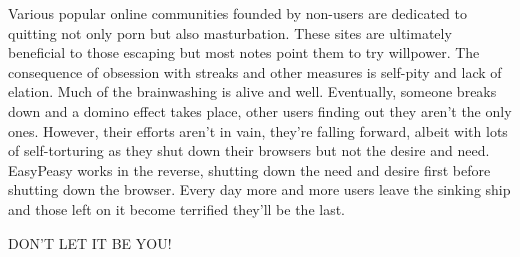 \documentclass[easypeasy.tex]{subfiles}
\begin{document}
Various popular online communities founded by non-users are dedicated to quitting not only porn but also masturbation. These sites are ultimately beneficial to those escaping but most notes point them to try willpower. The consequence of obsession with streaks and other measures is self-pity and lack of elation. Much of the brainwashing is alive and well. Eventually, someone breaks down and a domino effect takes place, other users finding out they aren't the only ones. However, their efforts aren't in vain, they're falling forward, albeit with lots of self-torturing as they shut down their browsers but not the desire and need. EasyPeasy works in the reverse, shutting down the need and desire first before shutting down the browser. Every day more and more users leave the sinking ship and those left on it become terrified they'll be the last.

{\huge DON'T LET IT BE YOU!}
\end{document}
